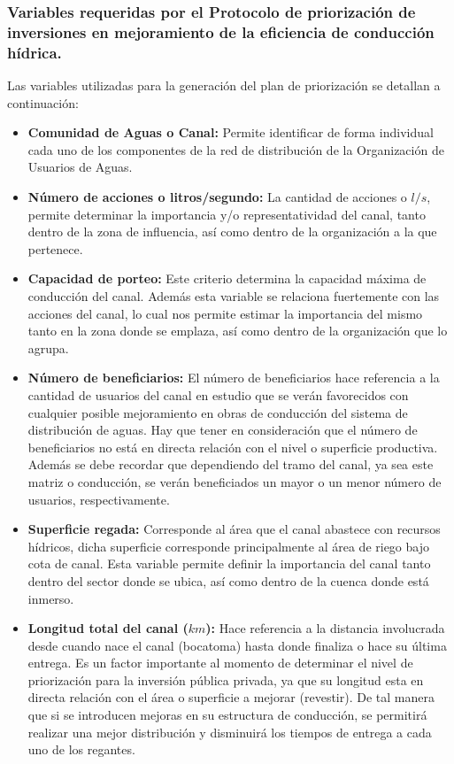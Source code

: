 \documentclass[]{article}
\begin{document}
\subsubsection{Variables requeridas por el Protocolo de priorización de inversiones en mejoramiento de la eficiencia de conducción hídrica.}

Las variables utilizadas para la generación del plan de priorización se detallan a continuación:

\begin{itemize}
\item \textbf{Comunidad de Aguas o Canal:} Permite identificar de forma individual cada uno de los componentes de la red de distribución de la Organización de Usuarios de Aguas.
\item \textbf{Número de acciones o litros/segundo:} La cantidad de acciones o $l/s$, permite determinar la importancia y/o representatividad del canal, tanto dentro de la zona de influencia, así como dentro de la organización a la que pertenece.
\item \textbf{Capacidad de porteo:} Este criterio determina la capacidad máxima de conducción del canal. Además esta variable se relaciona fuertemente con las acciones del canal, lo cual nos permite estimar la importancia del mismo tanto en la zona donde se emplaza, así como dentro de la organización que lo agrupa.
\item \textbf{Número de beneficiarios:} El número de beneficiarios hace referencia a la cantidad de usuarios del canal en estudio que se verán favorecidos con cualquier posible mejoramiento en obras de conducción del sistema de distribución de aguas. Hay que tener en consideración que el número de beneficiarios no está en directa relación con el nivel o superficie productiva. Además se debe recordar que dependiendo del tramo del canal, ya sea este matriz o conducción, se verán beneficiados un mayor o un menor número de usuarios, respectivamente.
\item \textbf{Superficie regada:} Corresponde al área que el canal abastece con recursos hídricos, dicha superficie corresponde principalmente al área de riego bajo cota de canal. Esta variable permite definir la importancia del canal tanto dentro del sector donde se ubica, así como dentro de la cuenca donde está inmerso.
\item \textbf{Longitud total del canal ($km$):} Hace referencia a la distancia involucrada desde cuando nace el canal (bocatoma) hasta donde finaliza o hace su última entrega. Es un factor importante al momento de determinar el nivel de priorización para la inversión pública privada, ya que su longitud esta en directa relación con el área o superficie a mejorar (revestir). De tal manera que si se introducen mejoras en su estructura de conducción, se permitirá realizar una mejor distribución y disminuirá los tiempos de entrega a cada uno de los regantes.

\end{itemize}
\end{document}

